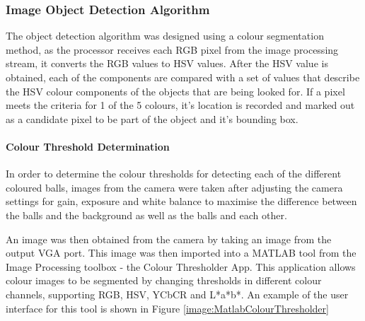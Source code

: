 \documentclass[a4paper]{article}
\begin{document}
\subsubsection{Image Object Detection Algorithm}

The object detection algorithm was designed using a colour segmentation method, as 
the processor receives each RGB pixel from the image processing stream, it converts the 
RGB values to HSV values. After the HSV value is obtained, each of the components 
are compared with a set of values that describe the HSV colour components of the objects 
that are being looked for. If a pixel meets the criteria for 1 of the 5 colours, it's 
location is recorded and marked out as a candidate pixel to be part of the object and 
it's bounding box. 

\paragraph*{Colour Threshold Determination}

In order to determine the colour thresholds for detecting each of the different 
coloured balls, images from the camera were taken after adjusting the camera settings
for gain, exposure and white balance to maximise the difference between the balls 
and the background as well as the balls and each other. 

An image was then obtained from the camera by taking an image from the output VGA 
port. This image was then imported into a MATLAB tool from the Image Processing toolbox - 
the Colour Thresholder App. This application allows colour images to be segmented by changing
thresholds in different colour channels, supporting RGB, HSV, YCbCR and L*a*b*. An example of 
the user interface for this tool is shown in Figure \ref{image:MatlabColourThresholder}
\end{document}
